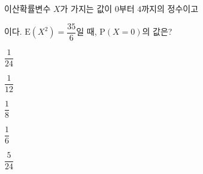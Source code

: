 이산확률변수 $X$가 가지는 값이 $0$부터 $4$까지의 정수이고 \par\smallskip{}\par\smallskip\noindent 이다. $\mathrm{E}(X^2)=\dfrac{35}{6}$일 때, $\mathrm{P}(X=0)$의 값은?
\begin{choices32}{\rule[-3ex]{0pt}{8ex}$\dfrac{1}{24}$}{\rule[-3ex]{0pt}{8ex}$\dfrac{1}{12}$}{\rule[-3ex]{0pt}{8ex}$\dfrac{1}{8}$}{\rule[-3ex]{0pt}{8ex}$\dfrac{1}{6}$}{\rule[-3ex]{0pt}{8ex}$\dfrac{5}{24}$}\end{choices32}
